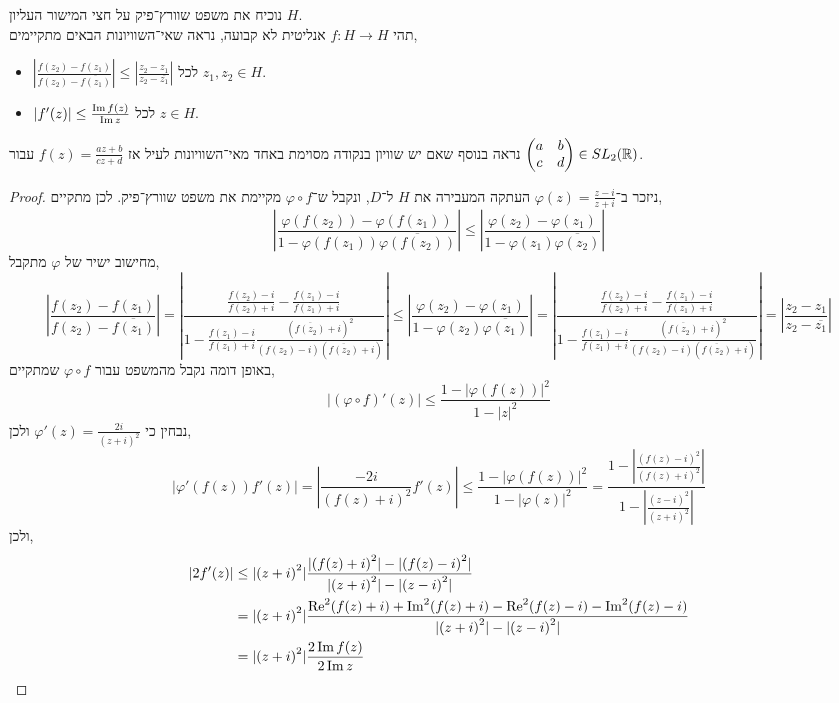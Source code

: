 \question{}
נוכיח את משפט שוורץ־פיק על חצי המישור העליון $H$. \\
תהי $f : H \to H$ אנליטית לא קבועה, נראה שאי־השוויונות הבאים מתקיימים,
\begin{itemize}
	\item $\left\lvert \frac{f(z_2) - f(z_1)}{f(z_2) - \overline{f(z_1)}} \right\rvert \le \left\lvert \frac{z_2 - z_1}{z_2 - \overline{z_1}} \right\rvert$ לכל $z_1, z_2 \in H$.
	\item $|f'(z)| \le \frac{\operatorname{Im} f(z)}{\operatorname{Im} z}$ לכל $z \in H$.
\end{itemize}
נראה בנוסף שאם יש שוויון בנקודה מסוימת באחד מאי־השוויונות לעיל אז $f(z) = \frac{az + b}{cz + d}$ עבור $\begin{pmatrix} a & b \\ c & d \end{pmatrix} \in SL_2(\mathbb{R})$.
\begin{proof}
	ניזכר ב־$\varphi(z) = \frac{z - i}{z + i}$ העתקה המעבירה את $H$ ל־$D$, ונקבל ש־$\varphi \circ f$ מקיימת את משפט שוורץ־פיק.
	לכן מתקיים,
	\[
		\left\lvert \frac{\varphi(f(z_2)) - \varphi(f(z_1))}{1 - \varphi(f(z_1)) \overline{\varphi(f(z_2))}} \right\rvert
		\le \left\lvert \frac{\varphi(z_2) - \varphi(z_1)}{1 - \varphi(z_1) \overline{\varphi(z_2)}} \right\rvert
	\]
	מחישוב ישיר של $\varphi$ מתקבל,
	\[
		\left\lvert \frac{f(z_2) - f(z_1)}{f(z_2) - \overline{f(z_1)}} \right\rvert
		= \left\lvert \frac{\frac{f(z_2) - i}{f(z_2) + i} - \frac{f(z_1) - i}{f(z_1) + i}}{1 - \frac{f(z_1) - i}{f(z_1) + i} \frac{{(\overline{f(z_2)} + i)}^2}{(f(z_2) - i)(\overline{f(z_2)} + i)}} \right\rvert
		\le \left\lvert \frac{\varphi(z_2) - \varphi(z_1)}{1 - \varphi(z_2) \overline{\varphi(z_1)}} \right\rvert
		= \left\lvert \frac{\frac{f(z_2) - i}{f(z_2) + i} - \frac{f(z_1) - i}{f(z_1) + i}}{1 - \frac{f(z_1) - i}{f(z_1) + i} \frac{{(\overline{f(z_2)} + i)}^2}{(f(z_2) - i)(\overline{f(z_2)} + i)}} \right\rvert
		= \left\lvert \frac{z_2 - z_1}{z_2 - \overline{z_1}} \right\rvert
	\]
	באופן דומה נקבל מהמשפט עבור $\varphi \circ f$ שמתקיים,
	\[
		|(\varphi \circ f)'(z)| \le \frac{1 - {|\varphi(f(z))|}^2}{1 - {|z|}^2}
	\]
	נבחין כי $\varphi'(z) = \frac{2i}{{(z + i)}^2}$ ולכן,
	\[
		\left\lvert \varphi'(f(z)) f'(z) \right\rvert
		= \left\lvert \frac{-2i}{{(f(z) + i)}^2} f'(z) \right\rvert
		\le \frac{1 - {|\varphi(f(z))|}^2}{1 - {|\varphi(z)|}^2}
		= \frac{1 - \left\lvert \frac{{(f(z) - i)}^2}{{(f(z) + i)}^2} \right\rvert}{1 - \left\lvert \frac{{(z - i)}^2}{{(z + i)}^2} \right\rvert}
	\]
	ולכן,
	\begin{align*}
		\left\lvert 2 f'(z) \right\rvert
		& \le |{(z + i)}^2| \frac{{|(f(z) + i)}^2| - |{(f(z) - i)}^2| }{|{(z + i)}^2| - |{(z - i)}^2| } \\
		& = |{(z + i)}^2| \frac{\operatorname{Re}^2(f(z) + i) + \operatorname{Im}^2(f(z) + i) - \operatorname{Re}^2(f(z) - i) - \operatorname{Im}^2(f(z) - i)}{|{(z + i)}^2| - |{(z - i)}^2| } \\
		& = |{(z + i)}^2| \frac{2 \operatorname{Im} f(z)}{2 \operatorname{Im} z}
	\end{align*}
\end{proof}

